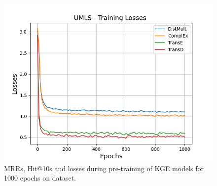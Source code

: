 \begin{figure}
    \begin{minipage}{.3\textwidth}
      \centering
      \includegraphics[width=\linewidth]{figures/results/pretrain/umls/pretrain_umls_losses.png}
    \end{minipage}%
    \caption{MRRs, Hit@10s and losses during pre-training of \ac{KGE} models for 1000 epochs on \umls dataset.}
    \label{fig:pretraining}
\end{figure}
